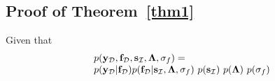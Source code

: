 \documentclass[conference]{IEEEtran}
\begin{document}
\subsection{Proof of Theorem~\ref{thm1}}
	\label{Derivation of the Lower Bound}
	\label{Derivation of Lower Bound L}
	\vspace{-3mm}
	Given that 	\vspace{-2mm}
	\begin{equation*}
		\begin{array}{l}	\vspace{-0mm}
	p(\mathbf{y}_\mathcal{D},\mathbf{f}_\mathcal{D},\mathbf{s}_\mathcal{I},\mathbf{\Lambda},\sigma_f)=
				\\
	p(\mathbf{y}_\mathcal{D}|\mathbf{f}_\mathcal{D}) p(\mathbf{f}_\mathcal{D}|\mathbf{s}_\mathcal{I},\mathbf{\Lambda},\sigma_f)\ p(\mathbf{s}_\mathcal{I})\ p(\mathbf{\Lambda})\ p(\sigma_f)
		\end{array}
	\end{equation*}
	\vspace{-3mm}
\end{document}

